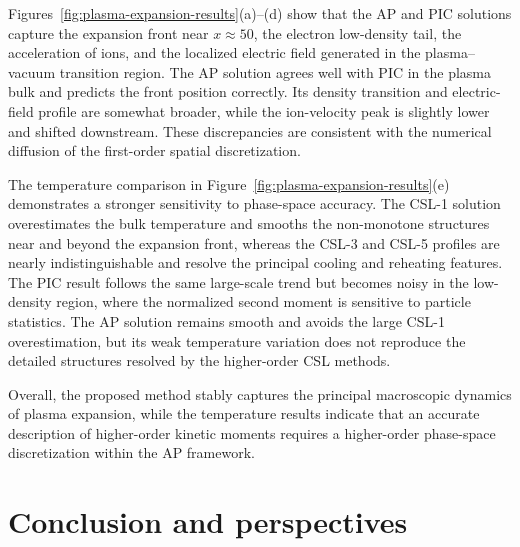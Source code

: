 \documentclass[pdflatex,final,10pt]{article}
\begin{document}
Figures~\ref{fig:plasma-expansion-results}(a)--(d) show that the AP and PIC solutions capture the expansion front near $x\approx50$, the electron low-density tail, the acceleration of ions, and the localized electric field generated in the plasma--vacuum transition region. The AP solution agrees well with PIC in the plasma bulk and predicts the front position correctly. Its density transition and electric-field profile are somewhat broader, while the ion-velocity peak is slightly lower and shifted downstream. These discrepancies are consistent with the numerical diffusion of the first-order spatial discretization.

The temperature comparison in Figure~\ref{fig:plasma-expansion-results}(e) demonstrates a stronger sensitivity to phase-space accuracy. The CSL-1 solution overestimates the bulk temperature and smooths the non-monotone structures near and beyond the expansion front, whereas the CSL-3 and CSL-5 profiles are nearly indistinguishable and resolve the principal cooling and reheating features. The PIC result follows the same large-scale trend but becomes noisy in the low-density region, where the normalized second moment is sensitive to particle statistics. The AP solution remains smooth and avoids the large CSL-1 overestimation, but its weak temperature variation does not reproduce the detailed structures resolved by the higher-order CSL methods.

Overall, the proposed method stably captures the principal macroscopic dynamics of plasma expansion, while the temperature results indicate that an accurate description of higher-order kinetic moments requires a higher-order phase-space discretization within the AP framework.



\section{Conclusion and perspectives}
\end{document}
